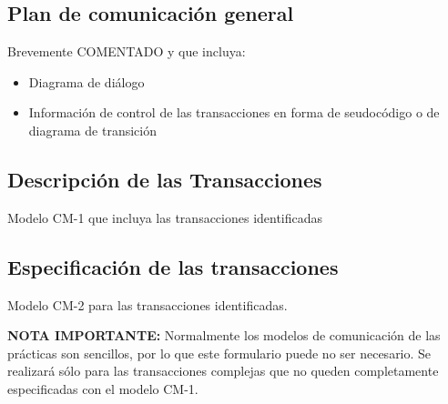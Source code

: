 \documentclass[12pt,a4paper,twoside,spanish]{article}      %
\begin{document}
\subsection{Plan de comunicación general}

Brevemente COMENTADO y que incluya:
\begin{itemize}
 \item Diagrama de diálogo
 \item Información de control de las transacciones en forma de
seudocódigo o de diagrama de transición
\end{itemize}

\subsection{Descripción de las Transacciones}
Modelo CM-1 que incluya las transacciones identificadas

\subsection{Especificación de las transacciones}

Modelo CM-2 para las transacciones identificadas. 

\textbf{NOTA IMPORTANTE:} Normalmente los modelos de comunicación de las prácticas son sencillos, por lo que este formulario puede no ser necesario. Se realizará sólo
para las transacciones complejas que no queden completamente
especificadas con el modelo CM-1.

\end{document}

